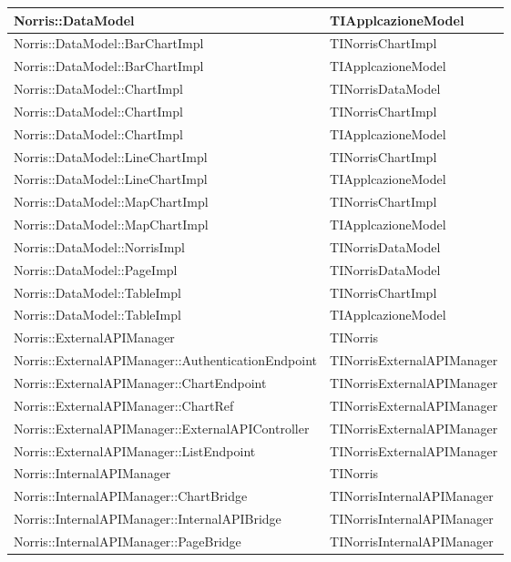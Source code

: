 \begin{longtabu}{| X | X |}
Norris::DataModel	&	TIApplcazioneModel	\\ \hline
Norris::DataModel::BarChartImpl	&	TINorrisChartImpl	\\ \hline
Norris::DataModel::BarChartImpl	&	TIApplcazioneModel	\\ \hline
Norris::DataModel::ChartImpl	&	TINorrisDataModel	\\ \hline
Norris::DataModel::ChartImpl	&	TINorrisChartImpl	\\ \hline
Norris::DataModel::ChartImpl	&	TIApplcazioneModel	\\ \hline
Norris::DataModel::LineChartImpl	&	TINorrisChartImpl	\\ \hline
Norris::DataModel::LineChartImpl	&	TIApplcazioneModel	\\ \hline
Norris::DataModel::MapChartImpl	&	TINorrisChartImpl	\\ \hline
Norris::DataModel::MapChartImpl	&	TIApplcazioneModel	\\ \hline
Norris::DataModel::NorrisImpl	&	TINorrisDataModel	\\ \hline
Norris::DataModel::PageImpl	&	TINorrisDataModel	\\ \hline
Norris::DataModel::TableImpl	&	TINorrisChartImpl	\\ \hline
Norris::DataModel::TableImpl	&	TIApplcazioneModel	\\ \hline
Norris::ExternalAPIManager	&	TINorris	\\ \hline
Norris::ExternalAPIManager::AuthenticationEndpoint	&	TINorrisExternalAPIManager	\\ \hline
Norris::ExternalAPIManager::ChartEndpoint	&	TINorrisExternalAPIManager	\\ \hline
Norris::ExternalAPIManager::ChartRef	&	TINorrisExternalAPIManager	\\ \hline
Norris::ExternalAPIManager::ExternalAPIController	&	TINorrisExternalAPIManager	\\ \hline
Norris::ExternalAPIManager::ListEndpoint	&	TINorrisExternalAPIManager	\\ \hline
Norris::InternalAPIManager	&	TINorris	\\ \hline
Norris::InternalAPIManager::ChartBridge	&	TINorrisInternalAPIManager	\\ \hline
Norris::InternalAPIManager::InternalAPIBridge	&	TINorrisInternalAPIManager	\\ \hline
Norris::InternalAPIManager::PageBridge	&	TINorrisInternalAPIManager	\\ \hline

\end{longtabu}
